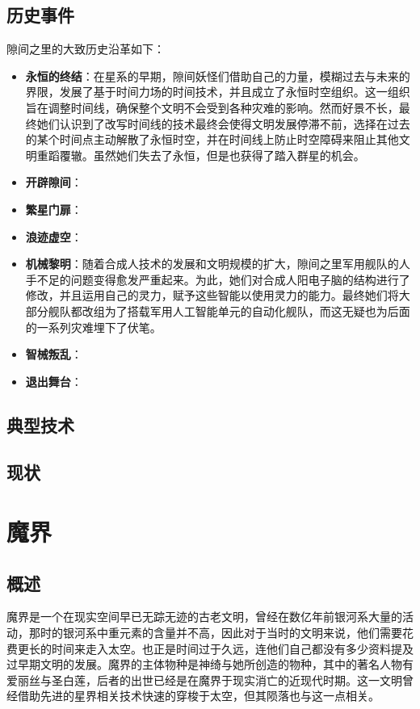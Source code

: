 \documentclass[10.5pt,compsoc,UTF8]{CjC}
\theoremstyle{mystyle}
\begin{document}
{\subsection{\color{gray}历史事件}

隙间之里的大致历史沿革如下：
\begin{itemize}
	\item \textbf{永恒的终结}：在星系的早期，隙间妖怪们借助自己的力量，模糊过去与未来的界限，发展了基于时间力场的时间技术，并且成立了永恒时空组织。这一组织旨在调整时间线，确保整个文明不会受到各种灾难的影响。然而好景不长，最终她们认识到了改写时间线的技术最终会使得文明发展停滞不前，选择在过去的某个时间点主动解散了永恒时空，并在时间线上防止时空障碍来阻止其他文明重蹈覆辙。虽然她们失去了永恒，但是也获得了踏入群星的机会。
	\item \textbf{开辟隙间}：
	\item \textbf{繁星门扉}：
	\item \textbf{浪迹虚空}：
	\item \textbf{机械黎明}：随着合成人技术的发展和文明规模的扩大，隙间之里军用舰队的人手不足的问题变得愈发严重起来。为此，她们对合成人阳电子脑的结构进行了修改，并且运用自己的灵力，赋予这些智能以使用灵力的能力。最终她们将大部分舰队都改组为了搭载军用人工智能单元的自动化舰队，而这无疑也为后面的一系列灾难埋下了伏笔。
	\item \textbf{智械叛乱}：
	\item \textbf{退出舞台}：
\end{itemize}

\subsection{\color{gray}典型技术}

\subsection{\color{gray}现状}

\section{魔界}

\subsection{\color{gray}概述}

魔界是一个在现实空间早已无踪无迹的古老文明，曾经在数亿年前银河系大量的活动，那时的银河系中重元素的含量并不高，因此对于当时的文明来说，他们需要花费更长的时间来走入太空。也正是时间过于久远，连他们自己都没有多少资料提及过早期文明的发展。魔界的主体物种是神绮与她所创造的物种，其中的著名人物有爱丽丝与圣白莲，后者的出世已经是在魔界于现实消亡的近现代时期。这一文明曾经借助先进的星界相关技术快速的穿梭于太空，但其陨落也与这一点相关。

}
\end{document}
